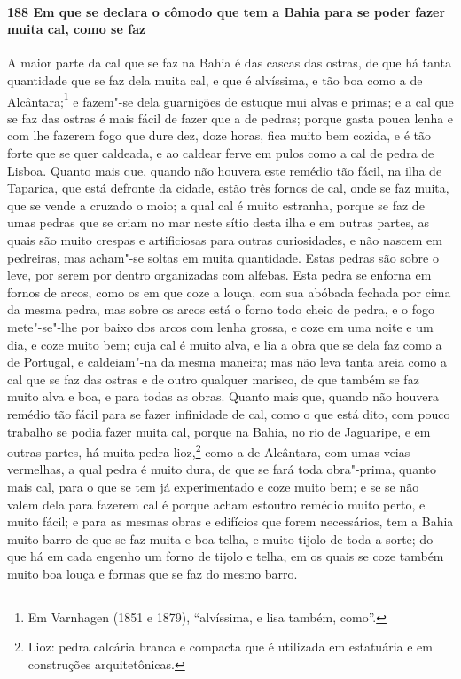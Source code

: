 \begin{linenumbers}
\paragraph{188 Em que se declara o cômodo que tem a Bahia para se poder fazer muita cal,
como se faz}\quad
A maior parte da cal que se faz na Bahia é das cascas das ostras, de que há tanta
quantidade que se faz dela muita cal, e que é alvíssima, e tão boa como a de
Alcântara;\footnote{ Em Varnhagen (1851 e 1879), ``alvíssima, e lisa também, como''.} e
fazem"-se dela guarnições de estuque mui alvas e primas; e a cal que se faz das ostras é
mais fácil de fazer que a de pedras; porque gasta pouca lenha e com lhe fazerem fogo que
dure dez, doze horas, fica muito bem cozida, e é tão forte que se quer caldeada, e ao
caldear ferve em pulos como a cal de pedra de Lisboa. Quanto mais que, quando não houvera
este remédio tão fácil, na ilha de Taparica, que está defronte da cidade, estão três
fornos de cal, onde se faz muita, que se vende a cruzado o moio; a qual cal é muito
estranha, porque se faz de umas pedras que se criam no mar neste sítio desta ilha e em
outras partes, as quais são muito crespas e artificiosas para outras curiosidades, e não
nascem em pedreiras, mas acham"-se soltas em muita quantidade. Estas pedras são sobre o
leve, por serem por dentro organizadas com alfebas. Esta pedra se enforna em fornos de
arcos, como os em que coze a louça, com sua abóbada fechada por cima da mesma pedra, mas
sobre os arcos está o forno todo cheio de pedra, e o fogo mete"-se"-lhe por baixo dos arcos
com lenha grossa, e coze em uma noite e um dia, e coze muito bem; cuja cal é muito alva, e
lia a obra que se dela faz como a de Portugal, e caldeiam"-na da mesma maneira; mas não
leva tanta areia como a cal que se faz das ostras e de outro qualquer marisco, de que
também se faz muito alva e boa, e para todas as obras. Quanto mais que, quando não houvera
remédio tão fácil para se fazer infinidade de cal, como o que está dito, com pouco
trabalho se podia fazer muita cal, porque na Bahia, no rio de Jaguaripe, e em outras
partes, há muita pedra lioz,\footnote{ Lioz: pedra calcária branca e compacta que é
utilizada em estatuária e em construções arquitetônicas.} como a de Alcântara, com umas
veias vermelhas, a qual pedra é muito dura, de que se fará toda obra"-prima, quanto mais
cal, para o que se tem já experimentado e coze muito bem; e se se não valem dela para
fazerem cal é porque acham estoutro remédio muito perto, e muito fácil; e para as mesmas
obras e edifícios que forem necessários, tem a Bahia muito barro de que se faz muita e boa
telha, e muito tijolo de toda a sorte; do que há em cada engenho um forno de tijolo e
telha, em os quais se coze também muito boa louça e formas que se faz do mesmo barro.


\end{linenumbers}

